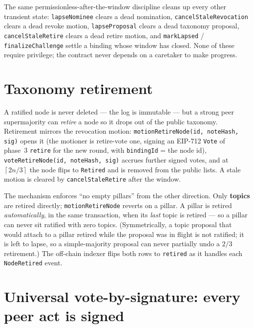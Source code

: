 \documentclass[11pt,a4paper]{article}
\newcommand{\ceilop}[1]{\ensuremath{\left\lceil #1 \right\rceil}}
\begin{document}
The same permissionless-after-the-window discipline cleans up every other
transient state: \texttt{lapseNominee} clears a dead nomination,
\texttt{cancelStaleRevocation} clears a dead revoke motion,
\texttt{lapseProposal} clears a dead taxonomy proposal,
\texttt{cancelStaleRetire} clears a dead retire motion, and
\texttt{markLapsed} / \texttt{finalizeChallenge} settle a binding whose
window has closed. None of these require privilege; the contract never
depends on a caretaker to make progress.

\section{Taxonomy retirement}

A ratified node is never deleted --- the log is immutable --- but a strong
peer supermajority can \emph{retire} a node so it drops out of the public
taxonomy. Retirement mirrors the revocation motion:
\texttt{motionRetireNode(id, noteHash, sig)} opens it (the motioner is
retire-vote one, signing an EIP-712 \texttt{Vote} of phase~3
\texttt{retire} for the new round, with \texttt{bindingId} = the node
id), \texttt{voteRetireNode(id, noteHash, sig)} accrues further signed
votes, and at $\ceilop{2n/3}$ the node flips to \texttt{Retired} and is
removed from the public lists. A stale motion is cleared by
\texttt{cancelStaleRetire} after the window.

The mechanism enforces ``no empty pillars'' from the other direction. Only
\textbf{topics} are retired directly; \texttt{motionRetireNode} reverts on a
pillar. A pillar is retired \emph{automatically}, in the same transaction,
when its \emph{last} topic is retired --- so a pillar can never sit ratified
with zero topics. (Symmetrically, a topic proposal that would attach to a
pillar retired while the proposal was in flight is not ratified; it is left
to lapse, so a simple-majority proposal can never partially undo a $2/3$
retirement.) The off-chain indexer flips both rows to \texttt{retired} as it
handles each \texttt{NodeRetired} event.

\section{Universal vote-by-signature: every peer act is signed}
\end{document}
